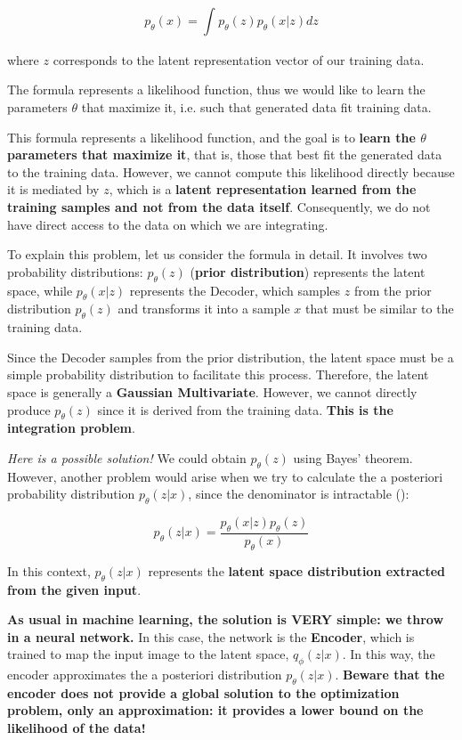 $$p_{\theta}(x)=\int_{} p_{\theta}(z)p_{\theta}(x|z)dz$$

where $z$ corresponds to the latent representation vector of our training data. 

The formula represents a likelihood function, thus we would like to learn the parameters $\theta$ that maximize it, i.e. such that generated data fit training data.

This formula represents a likelihood function, and the goal is to \textbf{learn the $\theta$ parameters that maximize it}, that is, those that best fit the generated data to the training data. However, we cannot compute this likelihood directly because it is mediated by $z$, which is a \textbf{latent representation learned from the training samples and not from the data itself}. Consequently, we do not have direct access to the data on which we are integrating.


To explain this problem, let us consider the formula in detail. It involves two probability distributions: $p_{\theta}(z)$ (\textbf{prior distribution}) represents the latent space, while $p_{\theta}(x|z)$ represents the Decoder, which samples $z$ from the prior distribution $p_{\theta}(z)$ and transforms it into a sample $x$ that must be similar to the training data.

Since the Decoder samples from the prior distribution, the latent space must be a simple probability distribution to facilitate this process. Therefore, the latent space is generally a \textbf{Gaussian Multivariate}. However, we cannot directly produce $p_{\theta}(z)$ since it is derived from the training data. \textbf{This is the integration problem}.

\textit{Here is a possible solution!} We could obtain $p_{\theta}(z)$ using Bayes' theorem. However, another problem would arise when we try to calculate the a posteriori probability distribution $p_{\theta}(z|x)$, since the denominator is intractable ():

$$p_{\theta}(z|x)= \frac{p_{\theta}(x|z)p_{\theta}(z)}{p_{\theta}(x)}$$

In this context, $p_{\theta}(z|x)$ represents the \textbf{latent space distribution extracted from the given input}.

\textbf{As usual in machine learning, the solution is VERY simple: we throw in a neural network.} In this case, the network is the \textbf{Encoder}, which is trained to map the input image to the latent space, $q_{\phi}(z|x)$. In this way, the encoder approximates the a posteriori distribution $p_{\theta}(z|x)$. \textbf{\textcolor{myred}{Beware that the encoder does not provide a global solution to the optimization problem, only an approximation: it provides a lower bound on the likelihood of the data!}}


